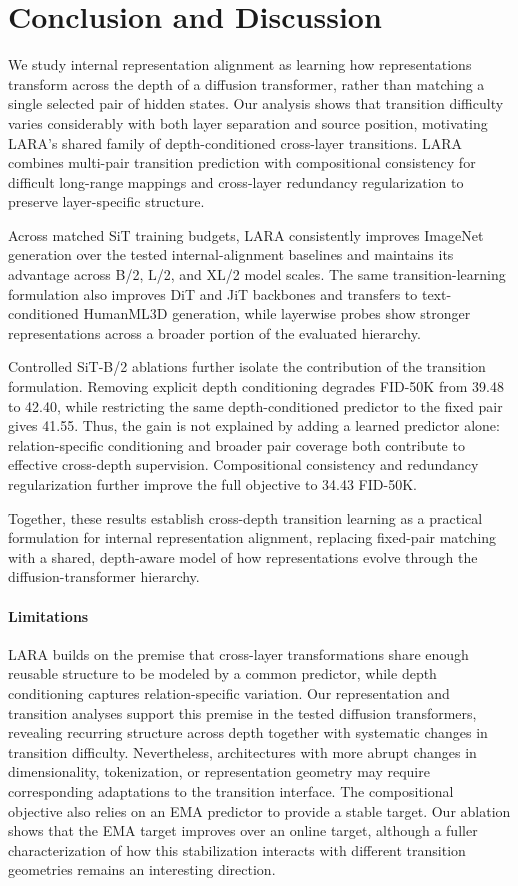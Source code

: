 \section{Conclusion and Discussion}
\label{sec:conclusion}

We study internal representation alignment as learning how representations transform across the depth of a diffusion transformer, rather than matching a single selected pair of hidden states. Our analysis shows that transition difficulty varies considerably with both layer separation and source position, motivating LARA's shared family of depth-conditioned cross-layer transitions. LARA combines multi-pair transition prediction with compositional consistency for difficult long-range mappings and cross-layer redundancy regularization to preserve layer-specific structure.

Across matched SiT training budgets, LARA consistently improves ImageNet generation over the tested internal-alignment baselines and maintains its advantage across B/2, L/2, and XL/2 model scales. The same transition-learning formulation also improves DiT and JiT backbones and transfers to text-conditioned HumanML3D generation, while layerwise probes show stronger representations across a broader portion of the evaluated hierarchy.

Controlled SiT-B/2 ablations further isolate the contribution of the transition formulation. Removing explicit depth conditioning degrades FID-50K from 39.48 to 42.40, while restricting the same depth-conditioned predictor to the fixed pair gives 41.55. Thus, the gain is not explained by adding a learned predictor alone: relation-specific conditioning and broader pair coverage both contribute to effective cross-depth supervision. Compositional consistency and redundancy regularization further improve the full objective to 34.43 FID-50K.

Together, these results establish cross-depth transition learning as a practical formulation for internal representation alignment, replacing fixed-pair matching with a shared, depth-aware model of how representations evolve through the diffusion-transformer hierarchy.

\paragraph{Limitations}
LARA builds on the premise that cross-layer transformations share enough reusable structure to be modeled by a common predictor, while depth conditioning captures relation-specific variation. Our representation and transition analyses support this premise in the tested diffusion transformers, revealing recurring structure across depth together with systematic changes in transition difficulty. Nevertheless, architectures with more abrupt changes in dimensionality, tokenization, or representation geometry may require corresponding adaptations to the transition interface. The compositional objective also relies on an EMA predictor to provide a stable target. Our ablation shows that the EMA target improves over an online target, although a fuller characterization of how this stabilization interacts with different transition geometries remains an interesting direction.

